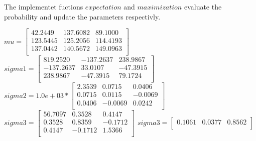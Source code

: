\documentclass[12pt]{article}
\begin{document}
The implementet fuctions $expectation$ and $maximization$ evaluate the probability and update the parameters respectivly. 

$ mu = \left[ \begin{array}{rrr}
   42.2449 & 137.6082  & 89.1000\\
123.5445 & 125.2056 & 114.4193\\
137.0442 & 140.5672 & 149.0963\\
\end{array}\right] $
\vspace{5mm}
$ sigma1 = \left[ \begin{array}{rrr}
  819.2520 &-137.2637 & 238.9867\\
-137.2637 &  33.0107  &-47.3915\\
238.9867 & -47.3915  & 79.1724\\
\end{array}\right] $
\vspace{5mm}
$ sigma2 = 1.0e+03 *\left[ \begin{array}{rrr}
    2.3539 &   0.0715 &   0.0406\\
0.0715  &  0.0115  & -0.0069\\
0.0406  & -0.0069 &   0.0242\\
\end{array}\right] $
\vspace{5mm}
$ sigma3 = \left[ \begin{array}{rrr}
   56.7097 &   0.3528 &   0.4147\\
0.3528  &  0.8359  & -0.1712\\
0.4147 &  -0.1712  &  1.5366\\
\end{array}\right] $
\vspace{5mm}
$ sigma3 = \left[ \begin{array}{rrr}
0.1061  &  0.0377  &  0.8562\\
\end{array}\right] $
\end{document}
